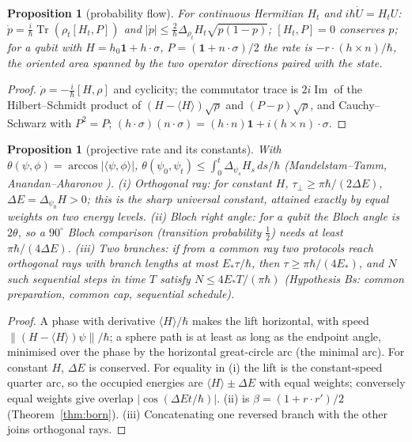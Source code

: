 \documentclass[aps,pra,onecolumn,superscriptaddress,nofootinbib,10pt]{revtex4-2}
\newtheorem{proposition}[theorem]{Proposition}
\theoremstyle{definition}
\theoremstyle{remark}
\newcommand{\im}{\operatorname{Im}}
\newcommand{\tr}{\operatorname{Tr}}
\newcommand{\ip}[2]{\langle #1,#2\rangle}
\begin{document}
\begin{proposition}[probability flow]\label{prop:bdflow}
For continuous Hermitian $H_t$ and $i\hbar\dot U=H_tU$: $\dot p=\tfrac i\hbar\tr(\rho_t[H_t,P])$ and $\lvert\dot p\rvert\le\tfrac2\hbar\Delta_{\rho_t}H_t\sqrt{p(1-p)}$; $[H_t,P]=0$ conserves $p$; for a
qubit with $H=h_0\mathbf1+h\cdot\sigma$, $P=(\mathbf1+n\cdot\sigma)/2$ the rate is $-r\cdot(h\times n)/\hbar$, the oriented area spanned by the two operator directions
paired with the state.
\end{proposition}
\begin{proof}
$\dot\rho=-\tfrac i\hbar[H,\rho]$ and cyclicity; the commutator trace is $2i\im$ of the Hilbert--Schmidt product of $(H-\langle H\rangle)\sqrt\rho$ and $(P-p)\sqrt\rho$,
and Cauchy--Schwarz with $P^2=P$; $(h\cdot\sigma)(n\cdot\sigma)=(h\cdot n)\mathbf1+i(h\times n)\cdot\sigma$.
\end{proof}

\begin{proposition}[projective rate and its constants]\label{prop:bdmt}
With $\theta(\psi,\phi)=\arccos\lvert\ip\psi\phi\rvert$, $\theta(\psi_0,\psi_t)\le\int_0^t\Delta_{\psi_s}H_s\,ds/\hbar$ (Mandelstam--Tamm, Anandan--Aharonov \cite{n4:MT,n4:AA}).
(i) \emph{Orthogonal ray}: for constant $H$, $\tau_\perp\ge\pi\hbar/(2\Delta E)$, $\Delta E=\Delta_{\psi_0}H>0$; this is the sharp universal constant, attained exactly by
equal weights on two energy levels.  (ii) \emph{Bloch right angle}: for a qubit the Bloch angle is $2\theta$, so a $90^\circ$
Bloch comparison (transition probability $\tfrac12$) needs at least $\pi\hbar/(4\Delta E)$.  (iii) \emph{Two branches}: if from a common ray two
protocols reach orthogonal rays with branch lengths at most $E_*\tau/\hbar$, then $\tau\ge\pi\hbar/(4E_*)$, and $N$ such sequential steps in time $T$
satisfy $N\le4E_*T/(\pi\hbar)$ (Hypothesis Bs: common preparation, common cap, sequential schedule).
\end{proposition}
\begin{proof}
A phase with derivative $\langle H\rangle/\hbar$ makes the lift horizontal, with speed $\lVert(H-\langle H\rangle)\psi\rVert/\hbar$; a sphere path is at least as long as
the endpoint angle, minimised over the phase by the horizontal great-circle arc (the minimal arc).  For
constant $H$, $\Delta E$ is conserved.  For equality in (i) the lift is the constant-speed quarter arc, so the occupied
energies are $\langle H\rangle\pm\Delta E$ with equal weights; conversely equal weights give overlap $\lvert\cos(\Delta Et/\hbar)\rvert$.  (ii) is $\beta=(1+r\cdot r')/2$
(Theorem~\ref{thm:born}).  (iii) Concatenating one reversed branch with the other joins orthogonal rays.
\end{proof}
\end{document}
